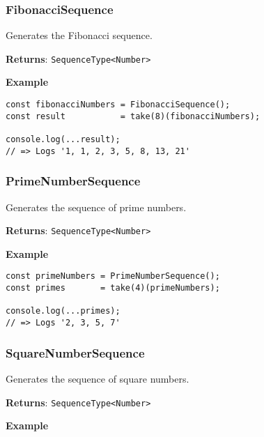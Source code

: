 \hypertarget{94f121b1-5195-4c3d-9814-bd0d04af5c3d}{%
\subsubsection{FibonacciSequence}\label{94f121b1-5195-4c3d-9814-bd0d04af5c3d}}

Generates the Fibonacci sequence.

\textbf{Returns}: \passthrough{\lstinline!SequenceType<Number>!}

\textbf{Example}

\begin{lstlisting}[label=6c80be8d-46ac-46b5-8bb9-055c77fa5a32]
const fibonacciNumbers = FibonacciSequence();
const result           = take(8)(fibonacciNumbers);
                                                   
console.log(...result);
// => Logs '1, 1, 2, 3, 5, 8, 13, 21'
\end{lstlisting}

\hypertarget{1984969b-ab43-4b4e-9089-49211b60162c}{%
\subsubsection{PrimeNumberSequence}\label{1984969b-ab43-4b4e-9089-49211b60162c}}

Generates the sequence of prime numbers.

\textbf{Returns}: \passthrough{\lstinline!SequenceType<Number>!}

\textbf{Example}

\begin{lstlisting}[label=177f3653-2cbd-4c00-86df-09f69914c634]
const primeNumbers = PrimeNumberSequence();
const primes       = take(4)(primeNumbers);
                                           
console.log(...primes);
// => Logs '2, 3, 5, 7'
\end{lstlisting}

\hypertarget{ba6a35dc-6b39-4e8d-9ab5-f04ec32009b3}{%
\subsubsection{SquareNumberSequence}\label{ba6a35dc-6b39-4e8d-9ab5-f04ec32009b3}}

Generates the sequence of square numbers.

\textbf{Returns}: \passthrough{\lstinline!SequenceType<Number>!}

\textbf{Example}

